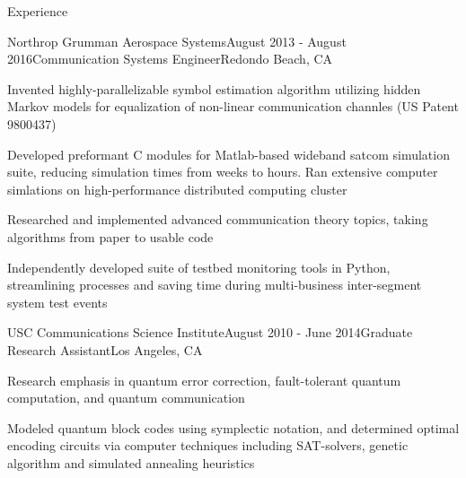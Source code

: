 \documentclass{resume} %
\begin{document}
\begin{rSection}{Experience}
\begin{rSubsection}{Northrop Grumman Aerospace Systems}{August 2013 - August 2016}{Communication Systems Engineer}{Redondo Beach, CA}
\item Invented highly-parallelizable symbol estimation algorithm utilizing hidden Markov models for equalization of non-linear communication channles (US Patent 9800437)
\item Developed preformant C modules for Matlab-based wideband satcom simulation suite, reducing simulation times from weeks to hours. Ran extensive computer simlations on high-performance distributed computing cluster
\item Researched and implemented advanced communication theory topics, taking algorithms from paper to usable code
\item Independently developed suite of testbed monitoring tools in Python, streamlining processes and saving time during multi-business inter-segment system test events
\end{rSubsection}

\begin{rSubsection}{USC Communications Science Institute}{August 2010 - June 2014}{Graduate Research Assistant}{Los Angeles, CA}
\item Research emphasis in quantum error correction, fault-tolerant quantum computation, and quantum communication
\item Modeled quantum block codes using symplectic notation, and determined optimal encoding circuits via computer techniques including SAT-solvers, genetic algorithm and simulated annealing heuristics
\end{rSubsection}


\end{rSection}
\end{document}
